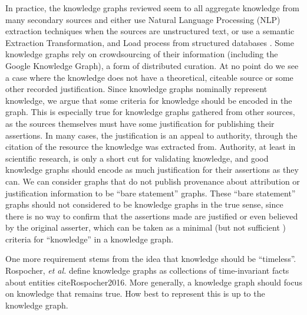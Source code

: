 In practice, the knowledge graphs reviewed seem to all aggregate knowledge from many secondary sources and either use Natural Language Processing (NLP) extraction techniques when the sources are unstructured text, or use a semantic Extraction Transformation, and Load process from structured databases \cite{McCusker_2009}.
Some knowledge graphs rely on crowdsourcing of their information (including the Google Knowledge Graph), a form of distributed curation.
At no point do we see a case where the knowledge does not have a theoretical, citeable source or some other recorded justification.
Since knowledge graphs nominally represent knowledge, we argue that some criteria for knowledge should be encoded in the graph.
This is especially true for knowledge graphs gathered from other sources, as the sources themselves must have some justification for publishing their assertions.
In many cases, the justification is an appeal to authority, through the citation of the resource the knowledge was extracted from.
Authority, at least in scientific research, is only a short cut for validating knowledge, and good knowledge graphs should encode as much justification for their assertions as they can.
We can consider graphs that do not publish provenance about attribution or justification information to be ``bare statement'' graphs.
These ``bare statement'' graphs should not considered to be knowledge graphs in the true sense, since there is no way to confirm that the assertions made are justified or even believed by the original asserter, which can be taken as a minimal (but not sufficient \cite{Gettier_1963}) criteria for ``knowledge'' in a knowledge graph.

One more requirement stems from the idea that knowledge should be ``timeless''.
Rospocher, \textit{et al.} define knowledge graphs as collections of time-invariant facts about entities cite{Rospocher2016}.
More generally, a knowledge graph should focus on knowledge that remains true.
How best to represent this is up to the knowledge graph.